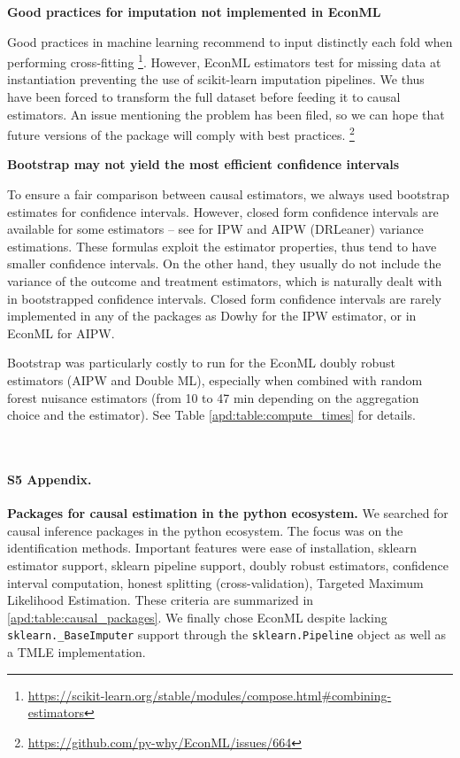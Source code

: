 \documentclass[10pt,letterpaper]{article}
\begin{document}
\textbf{Good practices for imputation not implemented in EconML}

Good practices in machine learning recommend to input distinctly each fold
when performing cross-fitting
\footnote{\url{https://scikit-learn.org/stable/modules/compose.html\#combining-estimators}}.
However, EconML estimators test for missing data at instantiation
preventing the use of scikit-learn imputation pipelines. We thus have been
forced to transform the full dataset before feeding it to causal estimators.
An issue mentioning the problem has been filed, so we can hope that future
versions of the package will comply with best practices. \footnote{\url{https://github.com/py-why/EconML/issues/664}}

\textbf{Bootstrap may not yield the most efficient confidence intervals}

To ensure a fair comparison between causal estimators, we always used
bootstrap estimates for confidence intervals. However, closed form
confidence intervals are available for some estimators -- see \cite{wager2020stats}
for IPW and AIPW (DRLeaner) variance estimations. These formulas exploit the
estimator properties, thus tend to have smaller confidence intervals. On the
other hand, they usually do not include the variance of the outcome and
treatment estimators, which is naturally dealt with in bootstrapped confidence
intervals. Closed form confidence intervals are rarely implemented in any of the
packages as Dowhy for the IPW estimator, or in EconML for AIPW.

Bootstrap was particularly costly to run for the EconML doubly robust
estimators (AIPW and Double ML), especially when combined with random forest nuisance
estimators (from 10 to 47 min depending on the aggregation choice and the
estimator). See Table \ref{apd:table:compute_times} for details.

\begin{table}[]
    \centering\small
    
    \\
    \caption{Compute times for the different estimation methods with 50 bootstrap replicates.}\label{apd:table:compute_times}
\end{table}



\paragraph*{S5 Appendix.}
\label{apd:packages}
{\bf Packages for causal estimation in the python ecosystem.}
We searched for causal inference packages in the python ecosystem. The focus
was on the identification methods. Important features were ease of
installation, sklearn estimator support, sklearn pipeline support, doubly
robust estimators, confidence interval computation, honest splitting
(cross-validation), Targeted Maximum Likelihood Estimation. These criteria are
summarized in \ref{apd:table:causal_packages}. We finally chose EconML despite
lacking \texttt{sklearn.\_BaseImputer} support through the
\texttt{sklearn.Pipeline} object as well as a TMLE implementation.
\end{document}
